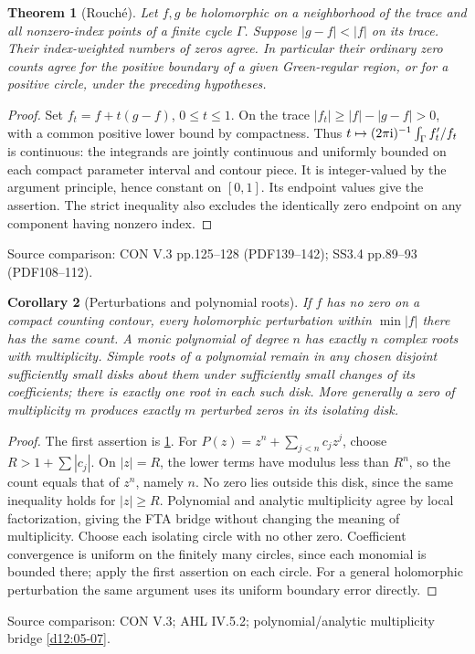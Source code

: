\documentclass[11pt,a4paper,openany]{book}
\newtheorem{theorem}{Theorem}[chapter]
\newtheorem{corollary}[theorem]{Corollary}
\theoremstyle{definition}
\theoremstyle{remark}\newtheorem{remark}[theorem]{Remark}
\newcommand{\family}[1]{}
\newcommand{\source}[1]{\par\begingroup\small\sffamily\color{black!65}Source comparison: #1\par\endgroup}
\begin{document}
\begin{theorem}[Rouch\'e]\family{D12.09.03}\label{d12:09-03}
Let $f,g$ be holomorphic on a neighborhood of the trace and all nonzero-index points of a finite cycle $\Gamma$. Suppose $|g-f|<|f|$ on its trace. Their index-weighted numbers of zeros agree. In particular their ordinary zero counts agree for the positive boundary of a given Green-regular region, or for a positive circle, under the preceding hypotheses.
\end{theorem}
\begin{proof}
Set $f_t=f+t(g-f)$, $0\le t\le1$. On the trace $|f_t|\ge |f|-|g-f|>0$, with a common positive lower bound by compactness. Thus $t\mapsto(2\pi\mathrm i)^{-1}\int_\Gamma f_t'/f_t$ is continuous: the integrands are jointly continuous and uniformly bounded on each compact parameter interval and contour piece. It is integer-valued by the argument principle, hence constant on $[0,1]$. Its endpoint values give the assertion. The strict inequality also excludes the identically zero endpoint on any component having nonzero index.
\end{proof}
\source{CON V.3 pp.125--128 (PDF139--142); SS3.4 pp.89--93 (PDF108--112).}

\begin{corollary}[Perturbations and polynomial roots]\family{D12.09.04}\label{d12:09-04}
If $f$ has no zero on a compact counting contour, every holomorphic perturbation within $\min|f|$ there has the same count. A monic polynomial of degree $n$ has exactly $n$ complex roots with multiplicity. Simple roots of a polynomial remain in any chosen disjoint sufficiently small disks about them under sufficiently small changes of its coefficients; there is exactly one root in each such disk. More generally a zero of multiplicity $m$ produces exactly $m$ perturbed zeros in its isolating disk.
\end{corollary}
\begin{proof}
The first assertion is \cref{d12:09-03}. For $P(z)=z^n+\sum_{j<n}c_jz^j$, choose $R>1+\sum|c_j|$. On $|z|=R$, the lower terms have modulus less than $R^n$, so the count equals that of $z^n$, namely $n$. No zero lies outside this disk, since the same inequality holds for $|z|\ge R$. Polynomial and analytic multiplicity agree by local factorization, giving the FTA bridge without changing the meaning of multiplicity. Choose each isolating circle with no other zero. Coefficient convergence is uniform on the finitely many circles, since each monomial is bounded there; apply the first assertion on each circle. For a general holomorphic perturbation the same argument uses its uniform boundary error directly.
\end{proof}
\source{CON V.3; AHL IV.5.2; polynomial/analytic multiplicity bridge \cref{d12:05-07}.}
\end{document}
